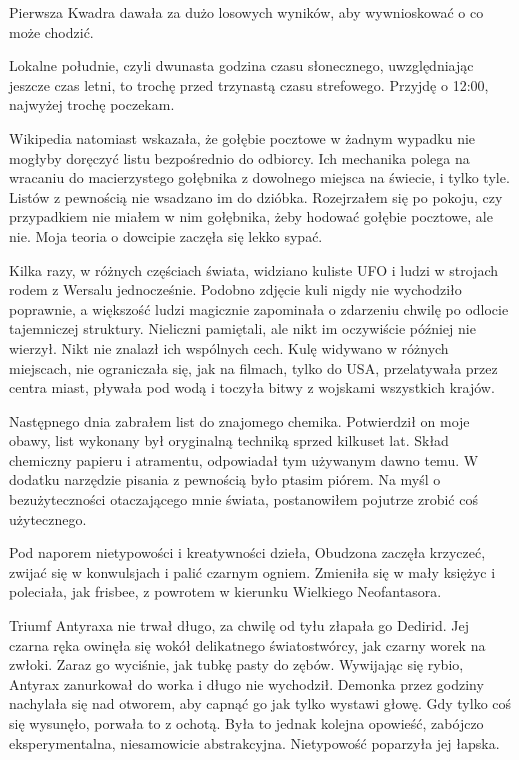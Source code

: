 Pierwsza Kwadra dawała za dużo losowych wyników, aby wywnioskować o co może chodzić.

Lokalne południe, czyli dwunasta godzina czasu słonecznego, uwzględniając jeszcze czas letni, to trochę przed trzynastą czasu strefowego.
Przyjdę o 12:00, najwyżej trochę poczekam.

Wikipedia natomiast wskazała, że gołębie pocztowe w żadnym wypadku nie mogłyby doręczyć listu bezpośrednio do odbiorcy.
Ich mechanika polega na wracaniu do macierzystego gołębnika z dowolnego miejsca na świecie, i tylko tyle.
Listów z pewnością nie wsadzano im do dzióbka.
Rozejrzałem się po pokoju, czy przypadkiem nie miałem w nim gołębnika, żeby hodować gołębie pocztowe, ale nie.
Moja teoria o dowcipie zaczęła się lekko sypać.

Kilka razy, w różnych częściach świata, widziano kuliste UFO i ludzi w strojach rodem z Wersalu jednocześnie.
Podobno zdjęcie kuli nigdy nie wychodziło poprawnie, a większość ludzi magicznie zapominała o zdarzeniu chwilę po odlocie tajemniczej struktury.
Nieliczni pamiętali, ale nikt im oczywiście później nie wierzył. Nikt nie znalazł ich wspólnych cech.
Kulę widywano w różnych miejscach, nie ograniczała się, jak na filmach, tylko do USA, przelatywała przez centra miast, pływała pod wodą
i toczyła bitwy z wojskami wszystkich krajów.

Następnego dnia zabrałem list do znajomego chemika. 
Potwierdził on moje obawy, list wykonany był oryginalną techniką sprzed kilkuset lat.
Skład chemiczny papieru i atramentu, odpowiadał tym używanym dawno temu.
W dodatku narzędzie pisania z pewnością było ptasim piórem.
Na myśl o bezużyteczności otaczającego mnie świata, postanowiłem pojutrze zrobić coś użytecznego.

\divider{}

Pod naporem nietypowości i kreatywności dzieła, Obudzona zaczęła krzyczeć, zwijać się w konwulsjach i palić czarnym ogniem.
Zmieniła się w mały księżyc i poleciała, jak frisbee, z powrotem w kierunku Wielkiego Neofantasora.

Triumf Antyraxa nie trwał długo, za chwilę od tyłu złapała go Dedirid.
Jej czarna ręka owinęła się wokół delikatnego światostwórcy, jak czarny worek na zwłoki.
Zaraz go wyciśnie, jak tubkę pasty do zębów.
Wywijając się rybio, Antyrax zanurkował do worka i długo nie wychodził.
Demonka przez godziny nachylała się nad otworem, aby capnąć go jak tylko wystawi głowę.
Gdy tylko coś się wysunęło, porwała to z ochotą.
Była to jednak kolejna opowieść, zabójczo eksperymentalna, niesamowicie abstrakcyjna.
Nietypowość poparzyła jej łapska.

